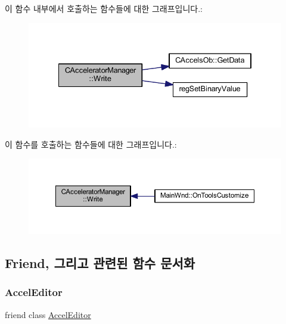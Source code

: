 이 함수 내부에서 호출하는 함수들에 대한 그래프입니다.\+:
\nopagebreak
\begin{figure}[H]
\begin{center}
\leavevmode
\includegraphics[width=334pt]{class_c_accelerator_manager_a6ddd05a54ab0e66bc6ca8a7af3742e61_cgraph}
\end{center}
\end{figure}
이 함수를 호출하는 함수들에 대한 그래프입니다.\+:
\nopagebreak
\begin{figure}[H]
\begin{center}
\leavevmode
\includegraphics[width=350pt]{class_c_accelerator_manager_a6ddd05a54ab0e66bc6ca8a7af3742e61_icgraph}
\end{center}
\end{figure}


\subsection{Friend, 그리고 관련된 함수 문서화}
\mbox{\label{class_c_accelerator_manager_ad13d9a415d0447ece033ae132991aefc}} 
\subsubsection{\texorpdfstring{Accel\+Editor}{AccelEditor}}
{\footnotesize\ttfamily friend class \mbox{\hyperlink{class_accel_editor}{Accel\+Editor}}\hspace{0.3cm}{\ttfamily [friend]}}



